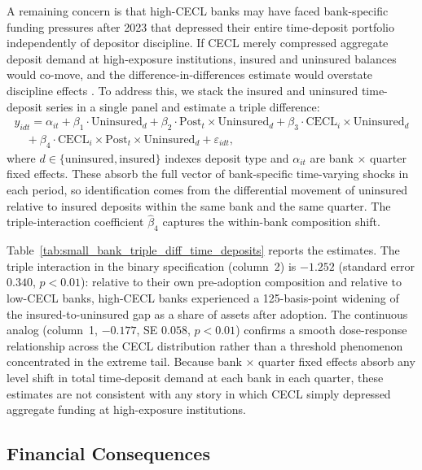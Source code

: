 A remaining concern is that high-CECL banks may have faced bank-specific funding
pressures after 2023 that depressed their entire time-deposit portfolio
independently of depositor discipline.  If CECL merely compressed aggregate
deposit demand at high-exposure institutions, insured and uninsured balances
would co-move, and the difference-in-differences estimate would overstate
discipline effects \citep{covitz2004market}.  To address this, we stack the
insured and uninsured time-deposit series in a single panel and estimate a
triple difference:
\begin{equation*}
\begin{split}
  y_{idt}
  = \alpha_{it}
  + \beta_1 \cdot \mathrm{Uninsured}_d
  + \beta_2 \cdot \mathrm{Post}_{t} \times \mathrm{Uninsured}_d
  + \beta_3 \cdot \mathrm{CECL}_i \times \mathrm{Uninsured}_d \\
  \quad + \beta_4 \cdot \mathrm{CECL}_i \times \mathrm{Post}_{t} \times \mathrm{Uninsured}_d
  + \varepsilon_{idt},
\end{split}
\end{equation*}
where $d \in \{\text{uninsured}, \text{insured}\}$ indexes deposit type and
$\alpha_{it}$ are bank $\times$ quarter fixed effects.  These absorb the full
vector of bank-specific time-varying shocks in each period, so identification
comes from the differential movement of uninsured relative to insured deposits
within the same bank and the same quarter.  The triple-interaction coefficient
$\hat{\beta}_4$ captures the within-bank composition shift.

Table~\ref{tab:small_bank_triple_diff_time_deposits} reports the estimates.  The
triple interaction in the binary specification (column~2) is $-1.252$ (standard
error $0.340$, $p < 0.01$): relative to their own pre-adoption composition and
relative to low-CECL banks, high-CECL banks experienced a 125-basis-point
widening of the insured-to-uninsured gap as a share of assets after adoption.
The continuous analog (column~1, $-0.177$, SE $0.058$, $p < 0.01$) confirms a
smooth dose-response relationship across the CECL distribution rather than a
threshold phenomenon concentrated in the extreme tail.  Because bank $\times$
quarter fixed effects absorb any level shift in total time-deposit demand at each
bank in each quarter, these estimates are not consistent with any story in which
CECL simply depressed aggregate funding at high-exposure institutions.

\subsection{Financial Consequences}
\label{sec:results:financial}

